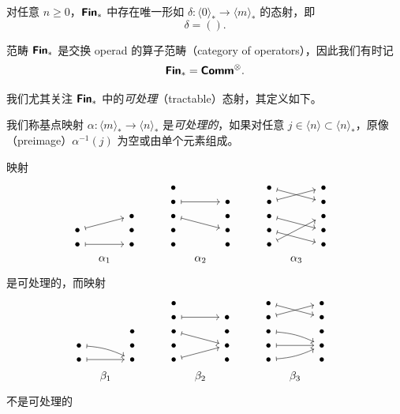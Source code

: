 \begin{example}
对任意 $n \geq 0$，${\boldsymbol{\mathsf{Fin}}}_*$ 中存在唯一形如 $\delta : \langle 0 \rangle_* \to \langle m \rangle_*$ 的态射，即
    \[
    \delta = ().
    \]
\end{example}

\begin{aside}
    范畴 ${\boldsymbol{\mathsf{Fin}}}_*$ 是交换 operad 的算子范畴（category of operators），因此我们有时记
    \[{\boldsymbol{\mathsf{Fin}}}_* = {\boldsymbol{\mathsf{Comm}}}^\otimes.\]
\end{aside}

\noindent 我们尤其关注 ${\boldsymbol{\mathsf{Fin}}}_*$ 中的{\it 可处理}（tractable）态射，其定义如下。

\begin{definition}\label{definitionofessentiallyinjective}
    我们称基点映射 $\alpha: \langle m \rangle_* \to \langle n \rangle_*$ 是{\it 可处理的}，如果对任意 $j \in \langle n \rangle \subset \langle n \rangle_*$，原像（preimage）$\alpha^{-1}(j)$ 为空或由单个元素组成。
\end{definition}

\begin{example}\label{essentiallyinjectivemorphismexample}
    映射
    \[ \begin{tikzcd} [row sep = 1, column sep = 8]
            & &          & & & \bullet & &        & & & \bullet \ar[drr,mapsto] & & \bullet \\
            & &          & & & \bullet \ar[rr,mapsto] & & \bullet & & & \bullet \ar[urr,mapsto] & & \bullet \\
            & & \bullet   & & & \bullet \ar[drr,mapsto] & & \bullet & & & \bullet \ar[drr,mapsto] & & \bullet \\
    \bullet \ar[urr,mapsto] & & \bullet & & & \bullet & & \bullet & & & \bullet \ar[drr,mapsto]  & & \bullet \\
    \bullet \ar[rr,mapsto]& & \bullet & & & \bullet & & \bullet & & & \bullet \ar[uurr,mapsto] & & \bullet \\
    & \alpha_1 & & & & & \alpha_2 & & & & & \alpha_3 & & \\
    \end{tikzcd} \]
    是可处理的，而映射
    \[ \begin{tikzcd} [row sep = 1, column sep = 8]
    & &          & & & \bullet & &        & & & \bullet \ar[drr,mapsto] & & \bullet \\
    & &          & & & \bullet \ar[rr,mapsto] & & \bullet & & & \bullet \ar[urr,mapsto] & & \bullet \\
    & & \bullet   & & & \bullet \ar[drr,mapsto] & & \bullet & & & \bullet \ar[drr,bend left = 10, mapsto] & & \bullet \\
    \bullet \ar[drr,bend left = 10, mapsto] & & \bullet & & & \bullet & & \bullet & & & \bullet \ar[rr,mapsto]  & & \bullet \\
    \bullet \ar[rr,mapsto]& & \bullet & & & \bullet \ar[urr,mapsto] & & \bullet & & & \bullet \ar[urr,bend right = 10, mapsto] & & \bullet \\
    & \beta_1 & & & & & \beta_2 & & & & & \beta_3 & & \\
    \end{tikzcd} \]
    不是可处理的
\end{example}

